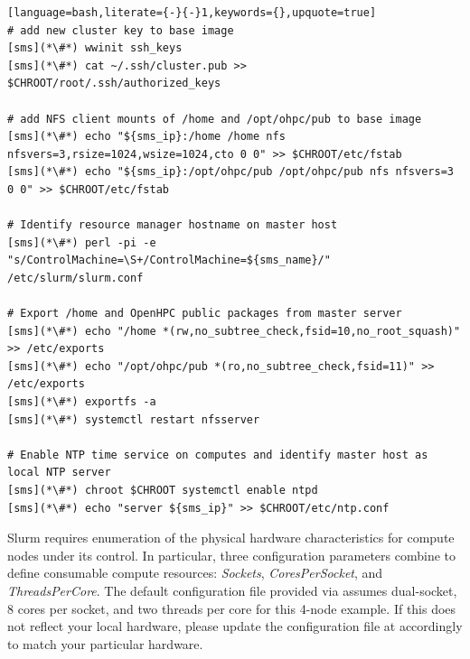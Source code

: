 \documentclass[letterpaper]{article}
\begin{document}
\begin{lstlisting}[language=bash,literate={-}{-}1,keywords={},upquote=true]
# add new cluster key to base image
[sms](*\#*) wwinit ssh_keys
[sms](*\#*) cat ~/.ssh/cluster.pub >> $CHROOT/root/.ssh/authorized_keys

# add NFS client mounts of /home and /opt/ohpc/pub to base image
[sms](*\#*) echo "${sms_ip}:/home /home nfs nfsvers=3,rsize=1024,wsize=1024,cto 0 0" >> $CHROOT/etc/fstab
[sms](*\#*) echo "${sms_ip}:/opt/ohpc/pub /opt/ohpc/pub nfs nfsvers=3 0 0" >> $CHROOT/etc/fstab

# Identify resource manager hostname on master host
[sms](*\#*) perl -pi -e "s/ControlMachine=\S+/ControlMachine=${sms_name}/" /etc/slurm/slurm.conf

# Export /home and OpenHPC public packages from master server
[sms](*\#*) echo "/home *(rw,no_subtree_check,fsid=10,no_root_squash)" >> /etc/exports
[sms](*\#*) echo "/opt/ohpc/pub *(ro,no_subtree_check,fsid=11)" >> /etc/exports
[sms](*\#*) exportfs -a
[sms](*\#*) systemctl restart nfsserver

# Enable NTP time service on computes and identify master host as local NTP server
[sms](*\#*) chroot $CHROOT systemctl enable ntpd
[sms](*\#*) echo "server ${sms_ip}" >> $CHROOT/etc/ntp.conf
\end{lstlisting}


\begin{center}
\begin{tcolorbox}[]
  \small Slurm requires enumeration of the physical hardware characteristics
  for compute nodes under its control. In particular, three configuration
  parameters combine to define consumable compute resources: {\em Sockets},
  {\em CoresPerSocket}, and {\em ThreadsPerCore}. The default configuration
  file provided via \OHPC{} assumes dual-socket, 8 cores per socket, and two
  threads per core for this 4-node example. If this does not reflect your local
  hardware, please update the configuration file at
   accordingly to match your particular hardware.
\end{tcolorbox}
\end{center}


\end{document}
